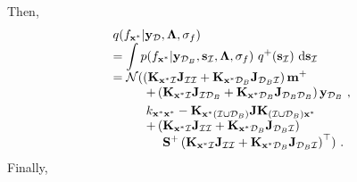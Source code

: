 \documentclass[conference]{IEEEtran}
\begin{document}
	Then,
	\begin{equation*}
		\begin{array}{l}
			\displaystyle q(f_{\mathbf{x}^*}|\mathbf{y}_\mathcal{D},\mathbf{\Lambda},\sigma_f)\\
			\displaystyle=\int p(f_{\mathbf{x}^*}|\mathbf{y}_{\mathcal{D}_B},\mathbf{s}_\mathcal{I},\mathbf{\Lambda},\sigma_f)\ q^+(\mathbf{s}_\mathcal{I})\ \mathrm{d}\mathbf{s}_\mathcal{I} \\
			\displaystyle =\mathcal{N}(\left(\mathbf{K}_{\mathbf{x}^*\mathcal{I}}\mathbf{J}_{\mathcal{I}\mathcal{I}}+\mathbf{K}_{\mathbf{x}^*\mathcal{D}_B}\mathbf{J}_{\mathcal{D}_B\mathcal{I}}\right)\mathbf{m}^+\\
			\displaystyle\qquad\ \ +\left(\mathbf{K}_{\mathbf{x}^*\mathcal{I}}\mathbf{J}_{\mathcal{I}\mathcal{D}_B}+\mathbf{K}_{\mathbf{x}^*\mathcal{D}_B}\mathbf{J}_{\mathcal{D}_B\mathcal{D}_B}\right)\mathbf{y}_{\mathcal{D}_B}\ ,\vspace{1mm}\\
			\displaystyle\qquad\ \ k_{\mathbf{x}^*\mathbf{x}^*}-
			\mathbf{K}_{\mathbf{x}^*(\mathcal{I}\cup\mathcal{D}_B)} 
			\mathbf{J}
			\mathbf{K}_{(\mathcal{I}\cup\mathcal{D}_B)\mathbf{x}^*}\\
			\displaystyle\qquad\ \ + \left(\mathbf{K}_{\mathbf{x}^*\mathcal{I}}\mathbf{J}_{\mathcal{I}\mathcal{I}}+\mathbf{K}_{\mathbf{x}^*\mathcal{D}_B}\mathbf{J}_{\mathcal{D}_B\mathcal{I}}\right)\\
			\displaystyle\qquad\qquad \mathbf{S}^+\left(\mathbf{K}_{\mathbf{x}^*\mathcal{I}}\mathbf{J}_{\mathcal{I}\mathcal{I}}+\mathbf{K}_{\mathbf{x}^*\mathcal{D}_B}\mathbf{J}_{\mathcal{D}_B\mathcal{I}}\right)^{\top} )\ .
		\end{array}
	\end{equation*}
	Finally,
\end{document}
